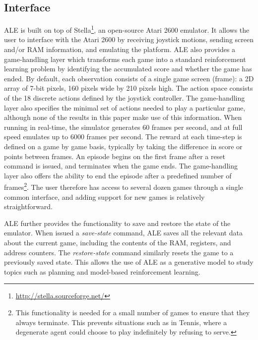 \documentclass[twoside,11pt]{article}
\newcommand{\gamename}[1]{{\sc #1}}
\begin{document}
\subsection{Interface}
ALE is built on top of Stella\footnote{\url{http://stella.sourceforge.net/}}, an open-source Atari 2600 emulator. 
It allows the user to interface with the Atari 2600 by receiving joystick motions, sending screen and/or RAM information, and emulating the platform. 
ALE also provides a game-handling layer which transforms each game into a standard reinforcement learning problem by identifying the accumulated score and whether the game has ended. By default, each observation consists of a single game screen (frame): a 2D array of 7-bit pixels, 160 pixels wide by 210 pixels high. 
The action space consists of the 18 discrete actions defined by the joystick controller.  The game-handling layer also specifies the minimal set of actions needed to play a particular game, although none of the results in this paper make use of this information.
When running in real-time, the simulator generates 60 frames per second, and at full speed emulates up to 6000 frames per second.
The reward at each time-step is defined on a game by game basis, typically by taking the difference in score or points between frames. 
An episode begins on the first frame after a reset command is issued, and terminates when the game ends. 
The game-handling layer also offers the ability to end the episode after a predefined number of frames\footnote{This functionality is needed for a small number of games to ensure that they always terminate.
This prevents situations such as in \gamename{Tennis}, where a degenerate agent could choose to play indefinitely by refusing to serve.}.
The user therefore has access to several dozen games through a single common interface, and adding 
support for new games is relatively straightforward.

ALE further provides the functionality to save and restore the state of the emulator. 
When issued a \emph{save-state} command, ALE saves all the relevant data about the current game, including the contents of the RAM, registers, and address counters. 
The \emph{restore-state} command similarly resets the game to a previously saved state. 
This allows the use of ALE as a generative model to study topics such as planning and model-based reinforcement learning.
\end{document}
